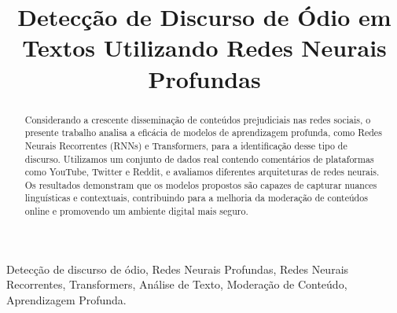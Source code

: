 \documentclass[conference]{IEEEtran}
\begin{document}
\title{Detecção de Discurso de Ódio em Textos Utilizando Redes Neurais Profundas}

\author{
\and
{}
\and
{}
}

\maketitle

\begin{abstract}
Considerando a crescente disseminação de conteúdos prejudiciais nas redes sociais, o presente trabalho analisa a eficácia de modelos de aprendizagem profunda, como Redes Neurais Recorrentes (RNNs) e Transformers, para a identificação desse tipo de discurso. Utilizamos um conjunto de dados real contendo comentários de plataformas como YouTube, Twitter e Reddit, e avaliamos diferentes arquiteturas de redes neurais. Os resultados demonstram que os modelos propostos são capazes de capturar nuances linguísticas e contextuais, contribuindo para a melhoria da moderação de conteúdos online e promovendo um ambiente digital mais seguro.
\end{abstract}

\begin{IEEEkeywords}
Detecção de discurso de ódio, Redes Neurais Profundas, Redes Neurais Recorrentes, Transformers, Análise de Texto, Moderação de Conteúdo, Aprendizagem Profunda.
\end{IEEEkeywords}
\end{document}
